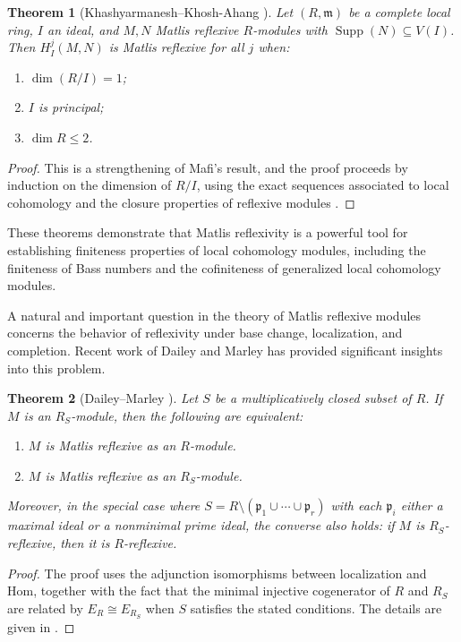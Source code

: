 \documentclass{kms-c}
\theoremstyle{plain}
\newtheorem{theorem}{Theorem}[section]
\theoremstyle{definition}
\theoremstyle{remark}
\begin{document}
\begin{theorem}[Khashyarmanesh--Khosh-Ahang \cite{Khashyarmanesh2008}]
\label{thm:khashyarmanesh}
Let \( (R, \mathfrak{m}) \) be a complete local ring, \( I \) an ideal, and \( M, N \) Matlis reflexive \( R \)-modules with \( \operatorname{Supp}(N) \subseteq V(I) \). Then \( H_I^j(M, N) \) is Matlis reflexive for all \( j \) when:
\begin{enumerate}
\item \( \dim(R/I) = 1 \);
\item \( I \) is principal;
\item \( \dim R \leq 2 \).
\end{enumerate}
\end{theorem}
\begin{proof}
This is a strengthening of Mafi's result, and the proof proceeds by induction on the dimension of \( R/I \), using the exact sequences associated to local cohomology and the closure properties of reflexive modules \cite[Theorem 2.4]{Khashyarmanesh2008}.
\end{proof}

These theorems demonstrate that Matlis reflexivity is a powerful tool for establishing finiteness properties of local cohomology modules, including the finiteness of Bass numbers and the cofiniteness of generalized local cohomology modules.

A natural and important question in the theory of Matlis reflexive modules concerns the behavior of reflexivity under base change, localization, and completion. Recent work of Dailey and Marley \cite{Dailey2017} has provided significant insights into this problem.

\begin{theorem}[Dailey--Marley \cite{Dailey2017}]
\label{thm:change-of-rings}
Let \( S \) be a multiplicatively closed subset of \( R \). If \( M \) is an \( R_S \)-module, then the following are equivalent:
\begin{enumerate}
\item \( M \) is Matlis reflexive as an \( R \)-module.
\item \( M \) is Matlis reflexive as an \( R_S \)-module.
\end{enumerate}
Moreover, in the special case where \( S = R \setminus (\mathfrak{p}_1 \cup \cdots \cup \mathfrak{p}_r) \) with each \( \mathfrak{p}_i \) either a maximal ideal or a nonminimal prime ideal, the converse also holds: if \( M \) is \( R_S \)-reflexive, then it is \( R \)-reflexive.
\end{theorem}
\begin{proof}
The proof uses the adjunction isomorphisms between localization and Hom, together with the fact that the minimal injective cogenerator of \( R \) and \( R_S \) are related by \( E_R \cong E_{R_S} \) when \( S \) satisfies the stated conditions. The details are given in \cite[Theorem 2.2]{Dailey2017}.
\end{proof}
\end{document}
